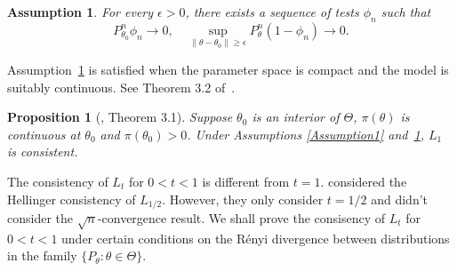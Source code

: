 \documentclass[11pt]{article}
\theoremstyle{plain}
\newtheorem{proposition}{\quad\quad Proposition}
\newtheorem{assumption}{\quad\quad Assumption}
\theoremstyle{definition}
\theoremstyle{remark}
\begin{document}
\begin{assumption}\label{Assumption2}
    For every $\epsilon>0$, there exists a sequence of tests $\phi_n$ such that
        \begin{equation*}
            P_{\theta_0}^n\phi_n\to 0,\quad \sup_{\|\theta-\theta_0\|\geq \epsilon} P_\theta^n(1-\phi_n)\to 0.
        \end{equation*}
\end{assumption}
Assumption~\ref{Assumption2} is satisfied when the parameter space is compact and the model is suitably continuous. See Theorem 3.2 of~\cite{Kleijn2012The}.

\begin{proposition}[\cite{Kleijn2012The}, Theorem 3.1]
    Suppose $\theta_0$ is an interior of $\Theta$, $\pi(\theta)$ is continuous at $\theta_0$ and $\pi(\theta_0)>0$.
    Under Assumptions \ref{Assumption1} and~\ref{Assumption2}, $L_1$ is consistent.
\end{proposition}





The consistency of $L_t$ for $0<t<1$ is different from $t=1$.
\cite{kar10563} considered the Hellinger consistency of $L_{1/2}$.
However, they only consider $t=1/2$ and didn't consider the $\sqrt{n}$-convergence result.
We shall prove the consisency of $L_{t}$ for $0<t<1$ under certain conditions on the R\'{e}nyi divergence between distributions in the family $\{P_\theta:\theta\in\Theta\}$.
\end{document}
